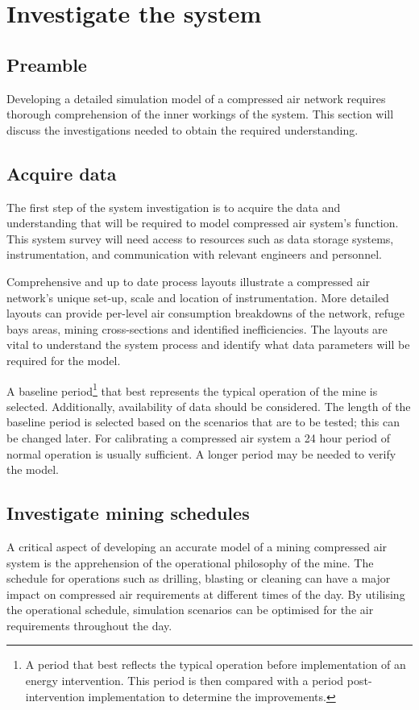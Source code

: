\section{Investigate the system}
	\subsection{Preamble}
		Developing a detailed simulation model of a compressed air network requires thorough comprehension of the inner workings of the system. This section will discuss the investigations needed to obtain the required understanding.
	\subsection{Acquire data} %
	The first step of the system investigation is to acquire the data and understanding that will be required to model compressed air system's function. This system survey will need access to resources such as data storage systems, instrumentation, and communication with relevant engineers and personnel.
	\par 
	Comprehensive and up to date process layouts illustrate a compressed air network's unique set-up, scale and location of instrumentation. More detailed layouts can provide per-level air consumption breakdowns of the network, refuge bays areas, mining cross-sections and identified inefficiencies. The layouts are vital to understand the system process and identify what data parameters will be required for the model. 
	\par 
	A baseline period\footnote{A period that best reflects the typical operation before implementation of an energy intervention. This period is then compared with a period post-intervention implementation to determine the improvements.} that best represents the typical operation of the mine is selected. Additionally, availability of data should be considered. The length of the baseline period is selected based on the scenarios that are to be tested; this can be changed later. For calibrating a compressed air system a 24 hour period of normal operation is usually sufficient. A longer period may be needed to verify the model. 

	\subsection{Investigate mining schedules}
	A critical aspect of developing an accurate model of a mining compressed air system is the apprehension of the operational philosophy of the mine. The schedule for operations such as drilling, blasting or cleaning can have a major impact on compressed air requirements at different times of the day. By utilising the operational schedule, simulation scenarios can be optimised for the air requirements throughout the day.	
	
